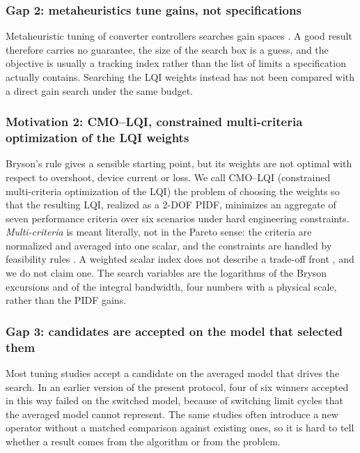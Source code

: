 \subsubsection{Gap 2: metaheuristics tune gains, not specifications}
Metaheuristic tuning of converter controllers searches gain spaces
\citep{Izci2022,Nanyan2024,Siano2014,ValenciaRivera2024}. A good result
therefore carries no guarantee, the size of the search box is a guess, and the
objective is usually a tracking index rather than the list of limits a
specification actually contains. Searching the LQI weights instead has not been
compared with a direct gain search under the same budget.

\subsubsection{Motivation 2: CMO--LQI, constrained multi-criteria optimization of the LQI weights}
Bryson's rule gives a sensible starting point, but its weights are not optimal
with respect to overshoot, device current or loss. We call CMO--LQI
(constrained multi-criteria optimization of the LQI) the problem of choosing the
weights so that the resulting LQI, realized as a 2-DOF PIDF, minimizes an
aggregate of seven performance criteria over six scenarios under hard
engineering constraints. \emph{Multi-criteria} is meant literally, not in the
Pareto sense: the criteria are normalized and averaged into one scalar, and the
constraints are handled by feasibility rules \citep{Deb2000}. A weighted scalar
index does not describe a trade-off front \citep{RodriguezMolina2020}, and we do
not claim one. The search variables are the logarithms of the Bryson excursions
and of the integral bandwidth, four numbers with a physical scale, rather than
the PIDF gains.

\subsubsection{Gap 3: candidates are accepted on the model that selected them}
Most tuning studies accept a candidate on the averaged model that drives the
search. In an earlier version of the present protocol, four of six winners
accepted in this way failed on the switched model, because of switching limit
cycles that the averaged model cannot represent. The same studies often
introduce a new operator without a matched comparison against existing ones,
so it is hard to tell whether a result comes from the algorithm or from the
problem.

